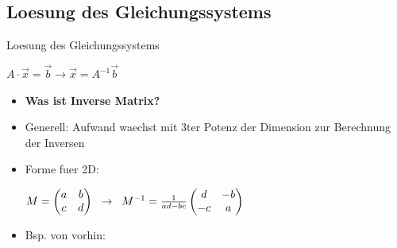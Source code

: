 \documentclass[10pt,aspectratio=169]{beamer}
\begin{document}
  \subsection{Loesung des Gleichungssystems}
  \begin{frame}{Loesung des Gleichungssystems}
    \begin{center}
      $A \cdot \vec{x} = \vec{b} \rightarrow \vec{x} = A^{-1}\vec{b}$
    \end{center}
    \begin{itemize}
      \item \textbf{Was ist Inverse Matrix?}
      \item Generell: Aufwand waechst mit 3ter Potenz der Dimension zur Berechnung der Inversen
      \item Forme fuer 2D:\\
      \begin{center}
        $M= \begin{pmatrix}
          a & b\\
          c & d\\
        \end{pmatrix}\hspace{0.2cm} \rightarrow \hspace{0.2cm}
        M^{-1} = \frac{1}{ad - bc}
        \begin{pmatrix}
          d & -b\\
          -c & a
        \end{pmatrix}$
      \end{center}
      \item Bsp. von vorhin:
      

\end{itemize}
\end{frame}
\end{document}
